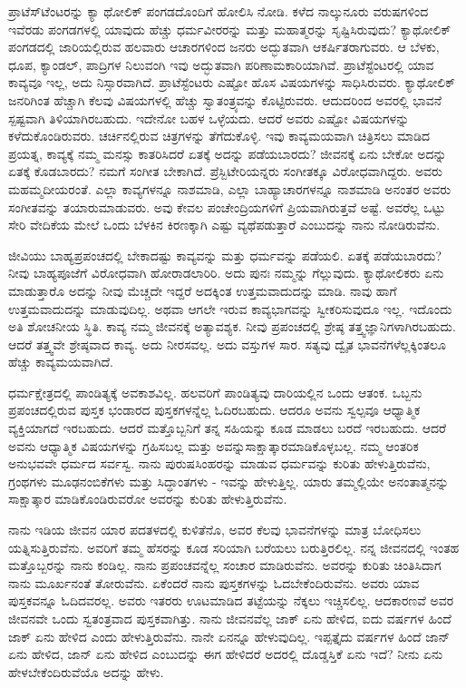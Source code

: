 ಪ್ರಾಟೆಸ್‌ಟೆಂಟರನ್ನು ಕ್ಯಾ ಥೋಲಿಕ್ ಪಂಗಡದೊಂದಿಗೆ ಹೋಲಿಸಿ ನೋಡಿ. ಕಳೆದ ನಾಲ್ಕುನೂರು ವರುಷಗಳಿಂದ ಇವೆರಡು ಪಂಗಡಗಳಲ್ಲಿ ಯಾವುದು ಹೆಚ್ಚು ಧರ್ಮವೀರರನ್ನು ಮತ್ತು ಮಹಾತ್ಮರನ್ನು ಸೃಷ್ಟಿಸಿರುವುದು? ಕ್ಯಾಥೋಲಿಕ್ ಪಂಗಡದಲ್ಲಿ ಜಾರಿಯಲ್ಲಿರುವ ಹಲವಾರು ಆಚಾರಗಳಿಂದ ಜನರು ಅದ್ಭುತವಾಗಿ ಆಕರ್ಷಿತರಾಗುವರು. ಆ ಬೆಳಕು, ಧೂಪ, ಕ್ಯಾಂಡಲ್, ಪಾದ್ರಿಗಳ ನಿಲುವಂಗಿ ಇವು ಅದ್ಭುತವಾಗಿ ಪರಿಣಾಮಕಾರಿಯಾಗಿವೆ. ಪ್ರಾಟೆಸ್ಟೆಂಟರಲ್ಲಿ ಯಾವ ಕಾವ್ಯವೂ ಇಲ್ಲ, ಅದು ನಿಸ್ಸಾರವಾಗಿದೆ. ಪ್ರಾಟೆಸ್ಟೆಂಟರು ಎಷ್ಟೋ ಹೊಸ ವಿಷಯಗಳನ್ನು ಸಾಧಿಸಿರುವರು. ಕ್ಯಾಥೋಲಿಕ್ ಜನರಿಗಿಂತ ಹೆಚ್ಚಾಗಿ ಕೆಲವು ವಿಷಯಗಳಲ್ಲಿ ಹೆಚ್ಚು ಸ್ವಾತಂತ್ರ್ಯವನ್ನು ಕೊಟ್ಟಿರುವರು. ಆದುದರಿಂದ ಅವರಲ್ಲಿ ಭಾವನೆ ಸ್ಪಷ್ಟವಾಗಿ ತಿಳಿಯಾಗಿರಬಹುದು. ಇದೇನೋ ಬಹಳ ಒಳ್ಳೆಯದು. ಆದರೆ ಅವರು ಎಷ್ಟೋ ವಿಷಯಗಳನ್ನು ಕಳೆದುಕೊಂಡಿರುವರು. ಚರ್ಚಿನಲ್ಲಿರುವ ಚಿತ್ರಗಳನ್ನು ತೆಗೆದುಕೊಳ್ಳಿ. ಇವು ಕಾವ್ಯಮಯವಾಗಿ ಚಿತ್ರಿಸಲು ಮಾಡಿದ ಪ್ರಯತ್ನ, ಕಾವ್ಯಕ್ಕೆ ನಮ್ಮ ಮನಸ್ಸು ಕಾತರಿಸಿದರೆ ಏತಕ್ಕೆ ಅದನ್ನು ಪಡೆಯಬಾರದು? ಜೀವನಕ್ಕೆ ಏನು ಬೇಕೋ ಅದನ್ನು ಏತಕ್ಕೆ ಕೊಡಬಾರದು? ನಮಗೆ ಸಂಗೀತ ಬೇಕಾಗಿದೆ. ಪ್ರೆಸ್ಬಿಟೇರಿಯನ್ನರು ಸಂಗೀತಕ್ಕೂ ವಿರೋಧವಾಗಿದ್ದರು. ಅವರು ಮಹಮ್ಮದೀಯರಂತೆ. ಎಲ್ಲಾ ಕಾವ್ಯಗಳನ್ನೂ ನಾಶಮಾಡಿ, ಎಲ್ಲಾ ಬಾಹ್ಯಾಚಾರಗಳನ್ನೂ ನಾಶಮಾಡಿ ಅನಂತರ ಅವರು ಸಂಗೀತವನ್ನು ತಯಾರುಮಾಡುವರು. ಅವು ಕೇವಲ ಪಂಚೇಂದ್ರಿಯಗಳಿಗೆ ಪ್ರಿಯವಾಗಿರುತ್ತವೆ ಅಷ್ಟೆ. ಅವರೆಲ್ಲ ಒಟ್ಟು ಸೇರಿ ವೇದಿಕೆಯ ಮೇಲೆ ಒಂದು ಬೆಳಕಿನ ಕಿರಣಕ್ಕಾಗಿ ಎಷ್ಟು ವ್ಯಥೆಪಡುತ್ತಾರೆ ಎಂಬುದನ್ನು ನಾನು ನೋಡಿರುವೆನು.

ಜೀವಿಯು ಬಾಹ್ಯಪ್ರಪಂಚದಲ್ಲಿ ಬೇಕಾದಷ್ಟು ಕಾವ್ಯವನ್ನು ಮತ್ತು ಧರ್ಮವನ್ನು ಪಡೆಯಲಿ. ಏತಕ್ಕೆ ಪಡೆಯಬಾರದು? ನೀವು ಬಾಹ್ಯಪೂಜೆಗೆ ವಿರೋಧವಾಗಿ ಹೋರಾಡಲಾರಿರಿ. ಅದು ಪುನಃ ನಮ್ಮನ್ನು ಗೆಲ್ಲುವುದು. ಕ್ಯಾಥೋಲಿಕರು ಏನು ಮಾಡುತ್ತಾರೊ ಅದನ್ನು ನೀವು ಮೆಚ್ಚದೇ ಇದ್ದರೆ ಅದಕ್ಕಿಂತ ಉತ್ತಮವಾದುದನ್ನು ಮಾಡಿ. ನಾವು ಹಾಗೆ ಉತ್ತಮವಾದುದನ್ನು ಮಾಡುವುದಿಲ್ಲ. ಅಥವಾ ಆಗಲೇ ಇರುವ ಕಾವ್ಯಭಾಗವನ್ನು ಸ್ವೀಕರಿಸುವುದೂ ಇಲ್ಲ. ಇದೊಂದು ಅತಿ ಶೋಚನೀಯ ಸ್ಥಿತಿ. ಕಾವ್ಯ ನಮ್ಮ ಜೀವನಕ್ಕೆ ಅತ್ಯಾವಶ್ಯಕ. ನೀವು ಪ್ರಪಂಚದಲ್ಲಿ ಶ್ರೇಷ್ಠ ತತ್ತ್ವಜ್ಞಾನಿಗಳಾಗಿರಬಹುದು. ಆದರೆ ತತ್ತ್ವವೇ ಶ್ರೇಷ್ಠವಾದ ಕಾವ್ಯ. ಅದು ನೀರಸವಲ್ಲ. ಅದು ವಸ್ತುಗಳ ಸಾರ. ಸತ್ಯವು ದ್ವೈತ ಭಾವನೆಗಳೆಲ್ಲಕ್ಕಿಂತಲೂ ಹೆಚ್ಚು ಕಾವ್ಯಮಯವಾಗಿದೆ.

ಧರ್ಮಕ್ಷೇತ್ರದಲ್ಲಿ ಪಾಂಡಿತ್ಯಕ್ಕೆ ಅವಕಾಶವಿಲ್ಲ. ಹಲವರಿಗೆ ಪಾಂಡಿತ್ಯವು ದಾರಿಯಲ್ಲಿನ ಒಂದು ಆತಂಕ. ಒಬ್ಬನು ಪ್ರಪಂಚದಲ್ಲಿರುವ ಪುಸ್ತಕ ಭಂಡಾರದ ಪುಸ್ತಕಗಳನ್ನೆಲ್ಲ ಓದಿರಬಹುದು. ಆದರೂ ಅವನು ಸ್ವಲ್ಪವೂ ಆಧ್ಯಾತ್ಮಿಕ ವ್ಯಕ್ತಿಯಾಗದೆ ಇರಬಹುದು. ಆದರೆ ಮತ್ತೊಬ್ಬನಿಗೆ ತನ್ನ ಸಹಿಯನ್ನು ಕೂಡ ಮಾಡಲು ಬರದೆ ಇರಬಹುದು. ಆದರೆ ಅವನು ಆಧ್ಯಾತ್ಮಿಕ ವಿಷಯಗಳನ್ನು ಗ್ರಹಿಸಬಲ್ಲ ಮತ್ತು ಅವನ್ನು\break ಸಾಕ್ಷಾತ್ಕಾರಮಾಡಿಕೊಳ್ಳಬಲ್ಲ. ನಮ್ಮ ಆಂತರಿಕ ಅನುಭವವೇ ಧರ್ಮದ ಸರ್ವಸ್ವ. ನಾನು ಪುರುಷಸಿಂಹರನ್ನು ಮಾಡುವ ಧರ್ಮವನ್ನು ಕುರಿತು ಹೇಳುತ್ತಿರುವೆನು, ಗ್ರಂಥಗಳು ಮೂಢನಂಬಿಕೆಗಳು ಮತ್ತು ಸಿದ್ಧಾಂತಗಳು - ಇವನ್ನು ಹೇಳುತ್ತಿಲ್ಲ. ಯಾರು ತಮ್ಮಲ್ಲಿಯೇ ಅನಂತಾತ್ಮನನ್ನು ಸಾಕ್ಷಾತ್ಕಾರ ಮಾಡಿಕೊಂಡಿರುವರೋ ಅವರನ್ನು ಕುರಿತು ಹೇಳುತ್ತಿರುವೆನು.

ನಾನು ಇಡಿಯ ಜೀವನ ಯಾರ ಪದತಳದಲ್ಲಿ ಕುಳಿತೆನೊ, ಅವರ ಕೆಲವು ಭಾವನೆಗಳನ್ನು ಮಾತ್ರ ಬೋಧಿಸಲು ಯತ್ನಿಸುತ್ತಿರುವೆನು. ಅವರಿಗೆ ತಮ್ಮ ಹೆಸರನ್ನು ಕೂಡ ಸರಿಯಾಗಿ ಬರೆಯಲು ಬರುತ್ತಿರಲಿಲ್ಲ. ನನ್ನ ಜೀವನದಲ್ಲಿ ಇಂತಹ ಮತ್ತೊಬ್ಬರನ್ನು ನಾನು ಕಂಡಿಲ್ಲ. ನಾನು ಪ್ರಪಂಚವನ್ನೆಲ್ಲ ಸಂಚಾರ ಮಾಡಿರುವೆನು. ಅವರನ್ನು ಕುರಿತು ಚಿಂತಿಸಿದಾಗ ನಾನು ಮೂರ್ಖನಂತೆ ತೋರುವೆನು. ಏಕೆಂದರೆ ನಾನು ಪುಸ್ತಕಗಳನ್ನು ಓದಬೇಕೆಂದಿರುವೆನು. ಅವರು ಯಾವ ಪುಸ್ತಕವನ್ನೂ ಓದಿದವರಲ್ಲ. ಅವರು ಇತರರು ಊಟಮಾಡಿದ ತಟ್ಟೆಯನ್ನು ನೆಕ್ಕಲು ಇಚ್ಚಿಸಲಿಲ್ಲ. ಆದಕಾರಣವೆ ಅವರ ಜೀವನವೇ ಒಂದು ಸ್ವತಂತ್ರವಾದ ಪುಸ್ತಕವಾಗಿತ್ತು. ನಾನು ಜೀವನವೆಲ್ಲ ಜಾಕ್ ಏನು ಹೇಳಿದ, ಐದು ವರ್ಷಗಳ ಹಿಂದೆ ಜಾಕ್ ಏನು ಹೇಳಿದ ಎಂದು ಹೇಳುತ್ತಿರುವೆನು. ನಾನೇ ಏನನ್ನೂ ಹೇಳುವುದಿಲ್ಲ. ಇಪ್ಪತ್ತೈದು ವರ್ಷಗಳ ಹಿಂದೆ ಜಾನ್ ಏನು ಹೇಳಿದ, ಜಾನ್ ಏನು ಹೇಳಿದ ಎಂಬುದನ್ನು ಈಗ ಹೇಳಿದರೆ ಅದರಲ್ಲಿ ದೊಡ್ಡಸ್ತಿಕೆ ಏನು ಇದೆ? ನೀನು ಏನು ಹೇಳಬೇಕೆಂದಿರುವೆಯೊ ಅದನ್ನು ಹೇಳು.

